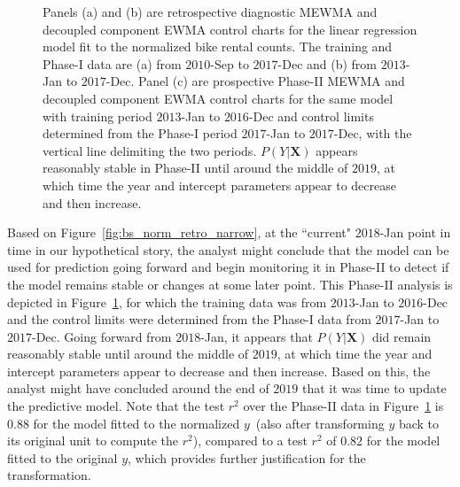 \documentclass[twoside,11pt]{article}
\begin{document}
\begin{figure}[H]
\begin{subfigure}[t]{0.374\linewidth}
     \captionsetup{width=.95\linewidth}
     \caption{}
     \label{fig:bs_norm_prospective}
\end{subfigure}
\caption{Panels (a) and (b) are retrospective diagnostic MEWMA and decoupled component EWMA control charts for the linear regression model fit to the normalized bike rental counts. The training and Phase-I data are (a) from $2010$-Sep to $2017$-Dec and (b) from $2013$-Jan to $2017$-Dec. Panel (c) are prospective Phase-II MEWMA and decoupled component EWMA control charts for the same model with training period $2013$-Jan to $2016$-Dec and control limits determined from the Phase-I period $2017$-Jan to $2017$-Dec, with the vertical line delimiting the two periods. $P(Y|\bm{X})$ appears reasonably stable in Phase-II until around the middle of $2019$, at which time the year and intercept parameters appear to decrease and then increase.}
\label{fig:bike_sharing_norm}
\end{figure}

Based on Figure~\ref{fig:bs_norm_retro_narrow}, at the ``current" $2018$-Jan point in time in our hypothetical story, the analyst might conclude that the model can be used for prediction going forward and begin monitoring it in Phase-II to detect if the model remains stable or changes at some later point. This Phase-II analysis is depicted in Figure~\ref{fig:bs_norm_prospective}, for which the training data was from $2013$-Jan to $2016$-Dec and the control limits were determined from the Phase-I data from $2017$-Jan to $2017$-Dec. Going forward from $2018$-Jan, it appears that $P(Y|\bm{X})$ did remain reasonably stable until around the middle of $2019$, at which time the year and intercept parameters appear to decrease and then increase. Based on this, the analyst might have concluded around the end of $2019$ that it was time to update the predictive model. Note that the test $r^2$ over the Phase-II data in Figure~\ref{fig:bs_norm_prospective} is $0.88$ for the model fitted to the normalized $y$~(also after transforming $y$ back to its original unit to compute the $r^2$), compared to a test $r^2$ of $0.82$ for the model fitted to the original $y$, which provides further justification for the transformation.
\end{document}
